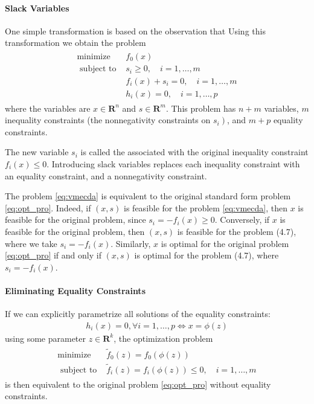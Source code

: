 \documentclass{article}
\begin{document}
\paragraph{Slack Variables}
One simple transformation is based on the observation that  Using this transformation we obtain the problem
\begin{align}
\begin{array}{ll}
\operatorname{minimize} & f_{0}(x) \\
\text { subject to } & s_{i} \geq 0, \quad i=1, \ldots, m \\
& f_{i}(x)+s_{i}=0, \quad i=1, \ldots, m \\
& h_{i}(x)=0, \quad i=1, \ldots, p
\end{array}\label{eq:vmecda}
\end{align}
where the variables are $x \in \mathbf{R}^{n}$ and $s \in \mathbf{R}^{m}$. This problem has $n+m$ variables, $m$ inequality constraints (the nonnegativity constraints on $\left.s_{i}\right)$, and $m+p$ equality constraints.

The new variable $s_{i}$ is called the  associated with the original inequality constraint $f_{i}(x) \leq 0 .$ Introducing slack variables replaces each inequality constraint with an equality constraint, and a nonnegativity constraint.

The problem \cref{eq:vmecda} is equivalent to the original standard form problem \cref{eq:opt_pro}. Indeed, if $(x, s)$ is feasible for the problem \cref{eq:vmecda}, then $x$ is feasible for the original
problem, since $s_{i}=-f_{i}(x) \geq 0$. Conversely, if $x$ is feasible for the original problem, then $(x, s)$ is feasible for the problem (4.7), where we take $s_{i}=-f_{i}(x)$. Similarly, $x$ is optimal for the original problem \cref{eq:opt_pro} if and only if $(x, s)$ is optimal for the problem (4.7), where $s_{i}=-f_{i}(x)$.
\paragraph{Eliminating Equality Constraints}
If we can explicitly parametrize all solutions of the equality constraints:
\begin{align*}
h_{i}(x)=0, \forall i=1, \ldots, p \Longleftrightarrow x=\phi(z)
\end{align*}
using some parameter $z \in \mathbf{R}^{k}$, the optimization problem
\begin{align*}
\begin{array}{ll}
\operatorname{minimize} & \tilde{f}_{0}(z)=f_{0}(\phi(z)) \\
\text { subject to } & \tilde{f}_{i}(z)=f_{i}(\phi(z)) \leq 0, \quad i=1, \ldots, m
\end{array}
\end{align*}
is then equivalent to the original problem \cref{eq:opt_pro} without equality constraints. 
\end{document}
